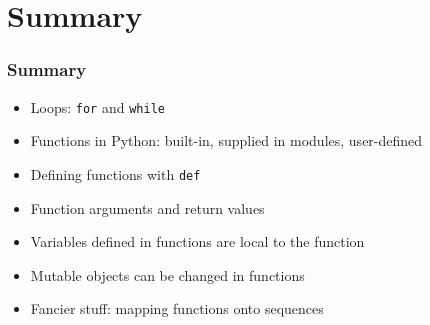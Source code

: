 \section{Summary}

\begin{frame}
  \frametitle{Summary}

  \begin{itemize}
  \item Loops: \texttt{for} and \texttt{while}
  \item Functions in Python: built-in, supplied in modules, user-defined
  \item Defining functions with \texttt{def}
  \item Function arguments and return values
  \item Variables defined in functions are local to the function
  \item Mutable objects can be changed in functions
  \item Fancier stuff: mapping functions onto sequences
  \end{itemize}
\end{frame}



